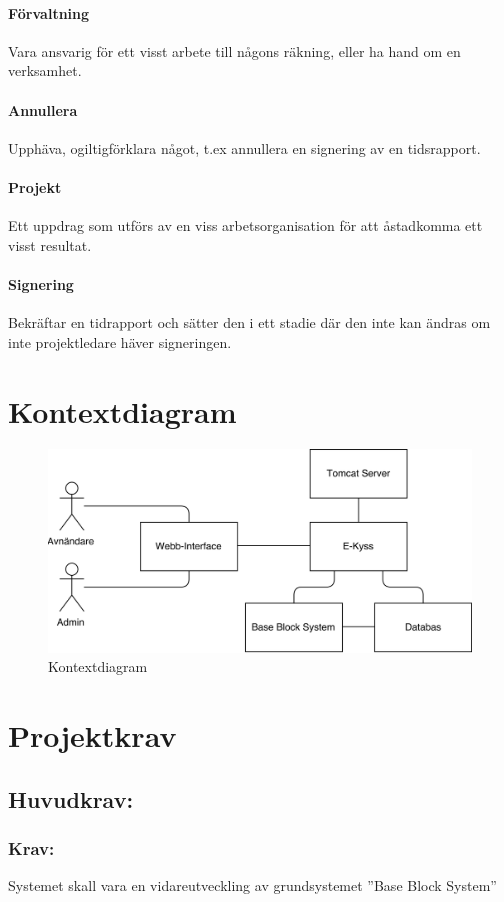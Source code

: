 \documentclass[paper=a4, fontsize=11pt,twoside]{article}
\begin{document}
\paragraph{Förvaltning}
\flushleft
Vara ansvarig för ett visst arbete till någons räkning, eller ha hand om en verksamhet.
\paragraph{Annullera}
\flushleft
Upphäva, ogiltigförklara något, t.ex annullera en signering av en tidsrapport.
\paragraph{Projekt}
\flushleft
Ett uppdrag som utförs av en viss arbetsorganisation för att åstadkomma ett visst resultat. 
\paragraph{Signering}
\flushleft
Bekräftar en tidrapport och sätter den i ett stadie där den inte kan ändras om inte projektledare häver signeringen.

\section{Kontextdiagram}
\begin{figure}[H]
\centering
\includegraphics[width = 12cm]{Kontext_Diagram.png} 
\caption{Kontextdiagram}
\end{figure}

\section{Projektkrav}
\subsection{Huvudkrav:}
\subsubsection{Krav:}
Systemet skall vara en vidareutveckling av grundsystemet ''Base Block System''
\end{document}
